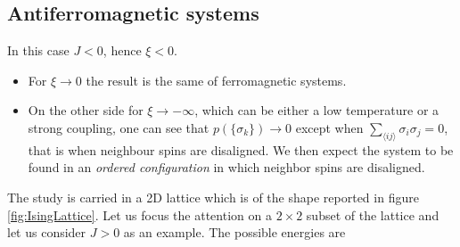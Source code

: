 \subsection{Antiferromagnetic systems}
\label{subsec:antiferromagnetic}
In this case $J < 0$, hence $\xi < 0$. 
\begin{itemize}
    \item For $\xi \to 0$ the result is the same of ferromagnetic systems.
    \item On the other side for $\xi \to -\infty$, which can be either a low temperature or a strong coupling, one can see that 
    $p(\{\sigma_k\}) \to 0$ except when $\sum_{\langle i j\rangle}\sigma_{i} \sigma_{j} = 0$, that is when neighbour spins are disaligned. We then expect the system to be found in an \emph{ordered configuration} in which 
    neighbor spins are disaligned.
\end{itemize}
The study is carried in a 2D lattice which is of the shape reported in figure \ref{fig:IsingLattice}.
Let us focus the attention on a $2\times2$ subset of the lattice and let us consider $J>0$ as an example. The possible energies are 
